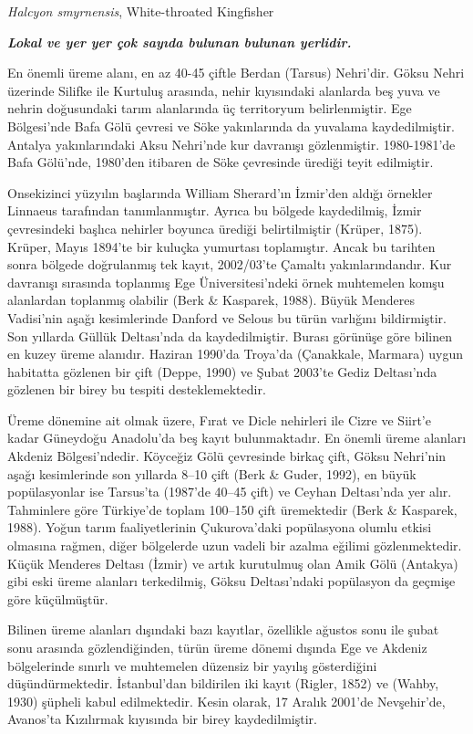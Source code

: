\documentclass[
  10.5pt,
  a4paper,
  DIV=11,
  numbers=noendperiod,
  twocolumn]{scrreprt}
\begin{document}
\emph{Halcyon smyrnensis}, White-throated Kingfisher

\textbf{\emph{Lokal ve yer yer çok sayıda bulunan bulunan yerlidir.}}

En önemli üreme alanı, en az 40-45 çiftle Berdan (Tarsus) Nehri'dir.
Göksu Nehri üzerinde Silifke ile Kurtuluş arasında, nehir kıyısındaki
alanlarda beş yuva ve nehrin doğusundaki tarım alanlarında üç
territoryum belirlenmiştir. Ege Bölgesi'nde Bafa Gölü çevresi ve Söke
yakınlarında da yuvalama kaydedilmiştir. Antalya yakınlarındaki Aksu
Nehri'nde kur davranışı gözlenmiştir. 1980-1981'de Bafa Gölü'nde,
1980'den itibaren de Söke çevresinde ürediği teyit edilmiştir.

Onsekizinci yüzyılın başlarında William Sherard'ın İzmir'den aldığı
örnekler Linnaeus tarafından tanımlanmıştır. Ayrıca bu bölgede
kaydedilmiş, İzmir çevresindeki başlıca nehirler boyunca ürediği
belirtilmiştir (Krüper, 1875). Krüper, Mayıs 1894'te bir kuluçka
yumurtası toplamıştır. Ancak bu tarihten sonra bölgede doğrulanmış tek
kayıt, 2002/03'te Çamaltı yakınlarındandır. Kur davranışı sırasında
toplanmış Ege Üniversitesi'ndeki örnek muhtemelen komşu alanlardan
toplanmış olabilir (Berk \& Kasparek, 1988). Büyük Menderes Vadisi'nin
aşağı kesimlerinde Danford ve Selous bu türün varlığını bildirmiştir.
Son yıllarda Güllük Deltası'nda da kaydedilmiştir. Burası görünüşe göre
bilinen en kuzey üreme alanıdır. Haziran 1990'da Troya'da (Çanakkale,
Marmara) uygun habitatta gözlenen bir çift (Deppe, 1990) ve Şubat
2003'te Gediz Deltası'nda gözlenen bir birey bu tespiti
desteklemektedir.

Üreme dönemine ait olmak üzere, Fırat ve Dicle nehirleri ile Cizre ve
Siirt'e kadar Güneydoğu Anadolu'da beş kayıt bulunmaktadır. En önemli
üreme alanları Akdeniz Bölgesi'ndedir. Köyceğiz Gölü çevresinde birkaç
çift, Göksu Nehri'nin aşağı kesimlerinde son yıllarda 8--10 çift (Berk
\& Guder, 1992), en büyük popülasyonlar ise Tarsus'ta (1987'de 40--45
çift) ve Ceyhan Deltası'nda yer alır. Tahminlere göre Türkiye'de toplam
100--150 çift üremektedir (Berk \& Kasparek, 1988). Yoğun tarım
faaliyetlerinin Çukurova'daki popülasyona olumlu etkisi olmasına rağmen,
diğer bölgelerde uzun vadeli bir azalma eğilimi gözlenmektedir. Küçük
Menderes Deltası (İzmir) ve artık kurutulmuş olan Amik Gölü (Antakya)
gibi eski üreme alanları terkedilmiş, Göksu Deltası'ndaki popülasyon da
geçmişe göre küçülmüştür.

Bilinen üreme alanları dışındaki bazı kayıtlar, özellikle ağustos sonu
ile şubat sonu arasında gözlendiğinden, türün üreme dönemi dışında Ege
ve Akdeniz bölgelerinde sınırlı ve muhtemelen düzensiz bir yayılış
gösterdiğini düşündürmektedir. İstanbul'dan bildirilen iki kayıt
(Rigler, 1852) ve (Wahby, 1930) şüpheli kabul edilmektedir. Kesin
olarak, 17 Aralık 2001'de Nevşehir'de, Avanos'ta Kızılırmak kıyısında
bir birey kaydedilmiştir.
\end{document}
